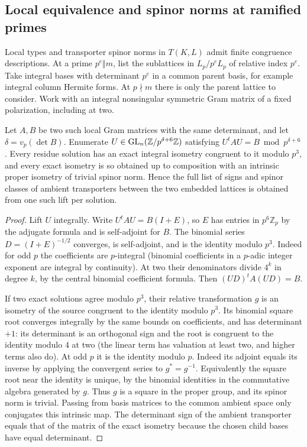 \subsection{Local equivalence and spinor norms at ramified primes}\label{sec:spincompute}
Local types and transporter spinor norms in \(T(K,L)\) admit
finite congruence descriptions. At a prime \(p^e\Vert m\), list the sublattices in \(L_p/p^eL_p\) of relative index \(p^e\). Take integral bases with determinant \(p^e\) in a common parent basis, for example integral column Hermite forms. At \(p\nmid m\) there is only the parent lattice to consider. Work with an integral nonsingular symmetric Gram matrix of a fixed polarization, including at two.

\begin{lemma}\label{lem:spincompute}
Let \(A,B\) be two such local Gram matrices with the same determinant, and let \(\delta=v_p(\det B)\). Enumerate \(U\in{\rm GL}_n(\mathbb Z/p^{\delta+6}\mathbb Z)\) satisfying \(U^tAU=B\bmod p^{\delta+6}\). Every residue solution has an exact integral isometry congruent to it modulo \(p^3\), and every exact isometry is so obtained up to composition with an intrinsic proper isometry of trivial spinor norm. Hence the full list of signs and spinor classes of ambient transporters between the two embedded lattices is obtained from one such lift per solution.
\end{lemma}
\begin{proof}
Lift \(U\) integrally. Write \(U^tAU=B(I+E)\), so \(E\) has entries in \(p^6\mathbb Z_p\) by the adjugate formula and is self-adjoint for \(B\). The binomial series \(D=(I+E)^{-1/2}\) converges, is self-adjoint, and is the identity modulo \(p^3\). Indeed for odd \(p\) the coefficients are \(p\)-integral (binomial coefficients in a \(p\)-adic integer exponent are integral by continuity). At two their denominators divide \(4^k\) in degree \(k\), by the central binomial coefficient formula. Then \((UD)^t A(UD)=B\). 

If two exact solutions agree modulo \(p^3\), their relative transformation \(g\) is an isometry of the source congruent to the identity modulo \(p^3\). Its binomial square root converges integrally by the same bounds on coefficients, and has determinant \(+1\): its determinant is an orthogonal sign and the root is congruent to the identity modulo \(4\) at two (the linear term has valuation at least two, and higher terms also do). At odd \(p\) it is the identity modulo \(p\). Indeed its adjoint equals its inverse by applying the convergent series to \(g^*=g^{-1}\). Equivalently the square root near the identity is unique, by the binomial identities in the commutative algebra generated by \(g\). Thus \(g\) is a square in the proper group, and its spinor norm is trivial. Passing from basis matrices to the common ambient space only conjugates this intrinsic map. The determinant sign of the ambient transporter equals that of the matrix of the exact isometry because the chosen child bases have equal determinant.
\end{proof}

